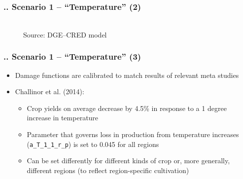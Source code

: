 \documentclass[11pt,aspectratio=169]{beamer}
\begin{document}
\begin{frame}
\frametitle{{\thesection.\thesubsection.\thesubsubsection} Scenario 1 -- "`Temperature"' (2)}
\begin{figure}
			\centering
			\\
			\footnotesize{Source: DGE--CRED model}
		\end{figure}
\end{frame}

\begin{frame}
\frametitle{{\thesection.\thesubsection.\thesubsubsection} Scenario 1 -- "`Temperature"' (3)}
\begin{itemize}
\item Damage functions are calibrated to match results of relevant meta studies
\item Challinor et al. (2014):
	\begin{itemize}
		\item Crop yields on average decrease by 4.5\% in response to a 1 degree increase in temperature
		\item Parameter that governs loss in production from temperature increases (\texttt{a\_T\_1\_1\_r\_p}) is set to 0.045 for all regions
		\item Can be set differently for different kinds of crop or, more generally, different regions (to reflect region-specific cultivation)
	\end{itemize}
\end{itemize}
\end{frame}
\end{document}
